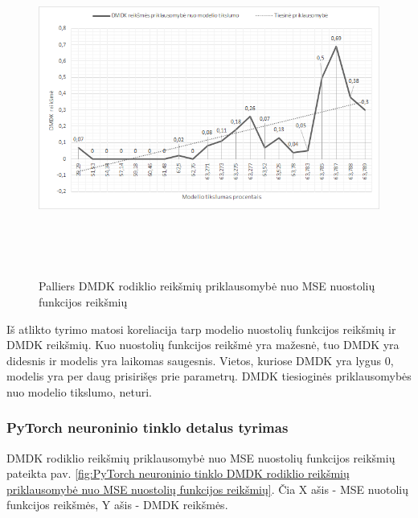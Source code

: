 \documentclass{VUMIFInfBakalaurinis}
\begin{document}
\begin{figure}[h]
  \centering
  \includegraphics[width=14cm,height=11cm,keepaspectratio]{img/pal_tyr_2.png}
  \caption{Palliers DMDK rodiklio reikšmių priklausomybė nuo MSE nuostolių funkcijos reikšmių}
  \label{fig:Palliers DMDK rodiklio reikšmių priklausomybė nuo MSE nuostolių funkcijos reikšmių}
\end{figure}

\par Iš atlikto tyrimo matosi koreliacija tarp modelio nuostolių funkcijos reikšmių ir DMDK reikšmių. Kuo nuostolių funkcijos reikšmė yra mažesnė, tuo DMDK yra didesnis ir modelis yra laikomas saugesnis. Vietos, kuriose DMDK yra lygus 0, modelis yra per daug prisirišęs prie parametrų. DMDK tiesioginės priklausomybės nuo modelio tikslumo, neturi.

\subsubsection{PyTorch neuroninio tinklo detalus tyrimas}
\par DMDK rodiklio reikšmių priklausomybė nuo MSE nuostolių funkcijos reikšmių pateikta pav. \ref{fig:PyTorch neuroninio tinklo DMDK rodiklio reikšmių priklausomybė nuo MSE nuostolių funkcijos reikšmių}. Čia X ašis - MSE nuotolių funkcijos reikšmės, Y ašis - DMDK reikšmės. 
\end{document}
